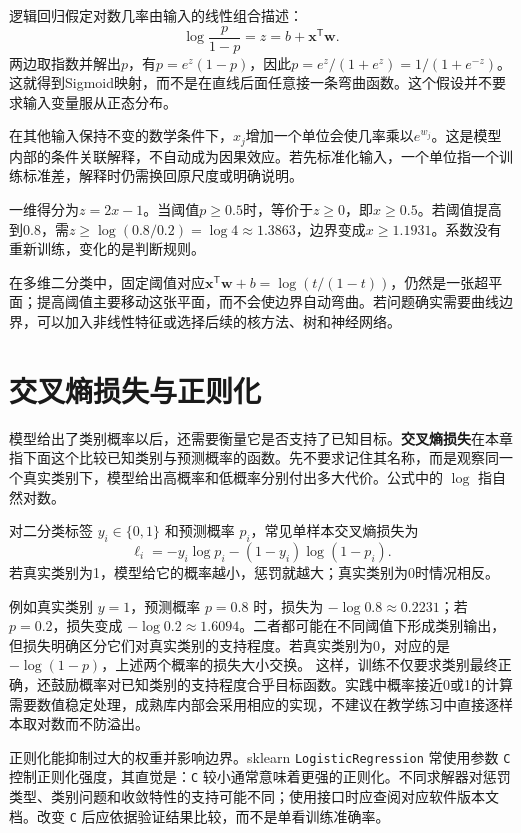 逻辑回归假定对数几率由输入的线性组合描述：
\[
\log\frac{p}{1-p}=z=b+\mathbf x^{\mathsf T}\mathbf w.
\]
两边取指数并解出$p$，有$p=e^z(1-p)$，因此$p=e^z/(1+e^z)=1/(1+e^{-z})$。这就得到Sigmoid映射，而不是在直线后面任意接一条弯曲函数。这个假设并不要求输入变量服从正态分布。

在其他输入保持不变的数学条件下，$x_j$增加一个单位会使几率乘以$e^{w_j}$。这是模型内部的条件关联解释，不自动成为因果效应。若先标准化输入，一个单位指一个训练标准差，解释时仍需换回原尺度或明确说明。

一维得分为$z=2x-1$。当阈值$p\ge0.5$时，等价于$z\ge0$，即$x\ge0.5$。若阈值提高到0.8，需$z\ge\log(0.8/0.2)=\log4\approx1.3863$，边界变成$x\ge1.1931$。系数没有重新训练，变化的是判断规则。

在多维二分类中，固定阈值对应$\mathbf x^{\mathsf T}\mathbf w+b=\log(t/(1-t))$，仍然是一张超平面；提高阈值主要移动这张平面，而不会使边界自动弯曲。若问题确实需要曲线边界，可以加入非线性特征或选择后续的核方法、树和神经网络。

\section{交叉熵损失与正则化}

模型给出了类别概率以后，还需要衡量它是否支持了已知目标。\textbf{交叉熵损失}在本章指下面这个比较已知类别与预测概率的函数。先不要求记住其名称，而是观察同一个真实类别下，模型给出高概率和低概率分别付出多大代价。公式中的 $\log$ 指自然对数。

对二分类标签 $y_i\in\{0,1\}$ 和预测概率 $p_i$，常见单样本交叉熵损失为
\begin{equation}
\ell_i=-y_i\log p_i-(1-y_i)\log(1-p_i).
\end{equation}
若真实类别为1，模型给它的概率越小，惩罚就越大；真实类别为0时情况相反。

例如真实类别 $y=1$，预测概率 $p=0.8$ 时，损失为 $-\log0.8\approx0.2231$；若 $p=0.2$，损失变成 $-\log0.2\approx1.6094$。二者都可能在不同阈值下形成类别输出，但损失明确区分它们对真实类别的支持程度。若真实类别为0，对应的是 $-\log(1-p)$，上述两个概率的损失大小交换。
这样，训练不仅要求类别最终正确，还鼓励概率对已知类别的支持程度合乎目标函数。实践中概率接近0或1的计算需要数值稳定处理，成熟库内部会采用相应的实现，不建议在教学练习中直接逐样本取对数而不防溢出。

正则化能抑制过大的权重并影响边界。sklearn \texttt{LogisticRegression} 常使用参数 \texttt{C} 控制正则化强度，其直觉是：\texttt{C} 较小通常意味着更强的正则化。不同求解器对惩罚类型、类别问题和收敛特性的支持可能不同；使用接口时应查阅对应软件版本文档。改变 \texttt{C} 后应依据验证结果比较，而不是单看训练准确率。

